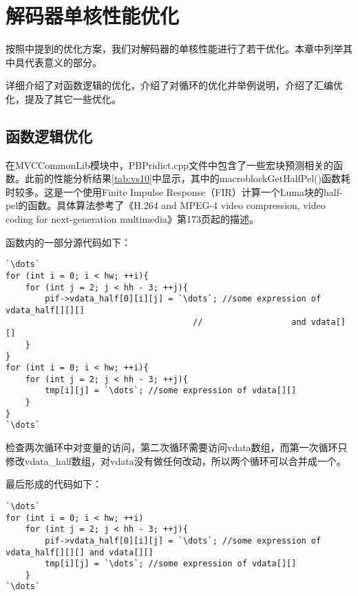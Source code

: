 

\chapter{解码器单核性能优化}
\label{cha:singlecoreopt}

按照中提到的优化方案，我们对解码器的单核性能进行了若干优化。本章中列举其中具代表意义的部分。

详细介绍了对函数逻辑的优化，介绍了对循环的优化并举例说明，介绍了汇编优化，提及了其它一些优化。

\section{函数逻辑优化}
\label{sec:singlecorelogicopt}

在MVCCommonLib模块中，PBPridict.cpp文件中包含了一些宏块预测相关的函数。此前的性能分析结果\autoref{tab:vs10}中显示，其中的macroblockGetHalfPel()函数耗时较多。这是一个使用Finite Impulse Response（FIR）计算一个Luma块的half-pel的函数。具体算法参考了《H.264 and MPEG-4 video compression, video coding for next-generation multimedia》\cite{richardson2003h}第173页起的描述。

函数内的一部分源代码如下：
\begin{lstlisting}[caption = {macroblockGetHalfPel()函数片段（优化前）}, label = lst:macroblockGetHalfPelorig]
`\dots`
for (int i = 0; i < hw; ++i){
	for (int j = 2; j < hh - 3; ++j){
		pif->vdata_half[0][i][j] = `\dots`; //some expression of vdata_half[][][]
		                              //                  and vdata[][]
	}
}
for (int i = 0; i < hw; ++i){
	for (int j = 2; j < hh - 3; ++j){
		tmp[i][j] = `\dots`; //some expression of vdata[][]
	}
}
`\dots`
\end{lstlisting}

检查两次循环中对变量的访问，第二次循环需要访问vdata数组，而第一次循环只修改vdata\_half数组，对vdata没有做任何改动，所以两个循环可以合并成一个。

最后形成的代码如下：

\begin{lstlisting}[caption = {macroblockGetHalfPel()函数片段（优化后）}, label = lst:macroblockGetHalfPelopt]
`\dots`
for (int i = 0; i < hw; ++i)
	for (int j = 2; j < hh - 3; ++j){
		pif->vdata_half[0][i][j] = `\dots`; //some expression of vdata_half[][][] and vdata[][]
		tmp[i][j] = `\dots`; //some expression of vdata[][]
	}
`\dots`
\end{lstlisting}

